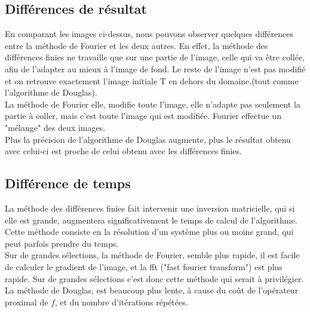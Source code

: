 \newpage
\subsection{Différences de résultat}
En comparant les images ci-dessus, nous pouvons observer quelques différences entre la méthode de Fourier et les deux autres. En effet, la méthode des différences finies ne travaille que sur une partie de l'image, celle qui va être collée, afin de l'adapter au mieux à l'image de fond. Le reste de l'image n'est pas modifié et on retrouve exactement l'image initiale T en dehors du domaine.(tout comme l'algorithme de Douglas). \\
La méthode de Fourier elle, modifie toute l'image, elle n'adapte pas seulement la partie à coller, mais c'est toute l'image qui est modifiée. Fourier effectue un "mélange" des deux images. \\
Plus la précision de l'algorithme de Douglas augmente, plus le résultat obtenu avec celui-ci est proche de celui obtenu avec les différences finies.
\subsection{Différence de temps}
La méthode des différences finies fait intervenir une inversion matricielle, qui si elle est grande, augmentera significativement le temps de calcul de l'algorithme. Cette méthode consiste en la résolution d'un système plus ou moins grand, qui peut parfois prendre du temps. \\
Sur de grandes sélections, la méthode de Fourier, semble plus rapide, il est facile de calculer le gradient de l'image, et la fft ("fast fourier transform") est plus rapide. Sur de grandes sélections c'est donc cette méthode qui serait à privilégier.\\
La méthode de Douglas, est beaucoup plus lente, à cause du coût de l'opérateur proximal de $f$, et du nombre d'itérations répétées.  

